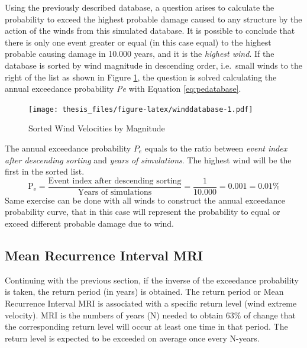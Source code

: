 \documentclass[12pt,twoside]{reedthesis}
\begin{document}
Using the previously described database, a question arises to calculate the probability to exceed the highest probable damage caused to any structure by the action of the winds from this simulated database. It is possible to conclude that there is only one event greater or equal (in this case equal) to the highest probable causing damage in 10.000 years, and it is the \emph{highest wind}. If the database is sorted by wind magnitude in descending order, i.e.~small winds to the right of the list as shown in Figure \ref{fig:winddatabase}, the question is solved calculating the annual exceedance probability \emph{Pe} with Equation \eqref{eq:pedatabase}.

\footnotesize
\begin{figure}
\centering
\texttt{[image: thesis\_files/figure-latex/winddatabase-1.pdf]}
\caption{\label{fig:winddatabase}Sorted Wind Velocities by Magnitude}
\end{figure}
\normalsize

The annual exceedance probability \(P_e\) equals to the ratio between \emph{event index after descending sorting} and \emph{years of simulations}. The highest wind will be the first in the sorted list.
\begin{equation}
\mathrm{
        P_e = \frac{\textrm{Event index after descending sorting}}{\textrm{Years of simulations}}= \frac{1}{10.000}=0.001=0.01\%
       }
  \label{eq:pedatabase}
\end{equation}
Same exercise can be done with all winds to construct the annual exceedance probability curve, that in this case will represent the probability to equal or exceed different probable damage due to wind.

\hypertarget{mean-recurrence-interval-mri}{%
\subsection{Mean Recurrence Interval MRI}\label{mean-recurrence-interval-mri}}

Continuing with the previous section, if the inverse of the exceedance probability is taken, the return period (in years) is obtained. The return period or Mean Recurrence Interval MRI is associated with a specific return level (wind extreme velocity). MRI is the numbers of years (N) needed to obtain 63\% of change that the corresponding return level will occur at least one time in that period. The return level is expected to be exceeded on average once every N-years.
\end{document}

